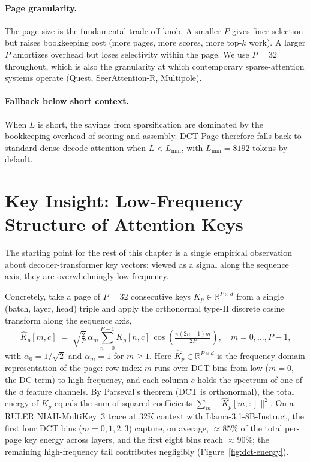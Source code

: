 \paragraph{Page granularity.}
The page size is the fundamental trade-off knob.  A smaller $P$ gives
finer selection but raises bookkeeping cost (more pages, more scores,
more top-$k$ work).  A larger $P$ amortizes overhead but loses
selectivity within the page.  We use $P{=}32$ throughout, which is
also the granularity at which contemporary sparse-attention systems
operate (Quest, SeerAttention-R, Multipole).

\paragraph{Fallback below short context.}
When $L$ is short, the savings from sparsification are dominated by
the bookkeeping overhead of scoring and assembly.  DCT-Page therefore
falls back to standard dense decode attention when
$L < L_\text{min}$, with $L_\text{min}{=}8192$ tokens by default.


\section{Key Insight: Low-Frequency Structure of Attention Keys}\label{sec:insight}

The starting point for the rest of this chapter is a single empirical
observation about decoder-transformer key vectors: viewed as a signal
along the sequence axis, they are overwhelmingly low-frequency.

Concretely, take a page of $P{=}32$ consecutive keys
$K_p \in \mathbb{R}^{P \times d}$ from a single (batch, layer, head)
triple and apply the orthonormal type-II discrete cosine transform
along the sequence axis,
\begin{equation}\label{eq:dct}
  \hat K_p[m, c] \;=\;
  \sqrt{\tfrac{2}{P}}\, \alpha_m \sum_{n=0}^{P-1}
  K_p[n, c]\,
  \cos\!\left(\tfrac{\pi (2n{+}1) m}{2P}\right),
  \quad m = 0,\dots,P{-}1,
\end{equation}
with $\alpha_0 = 1/\sqrt{2}$ and $\alpha_m = 1$ for $m \ge 1$.
Here $\hat K_p \in \mathbb{R}^{P \times d}$ is the frequency-domain
representation of the page: row index $m$ runs over DCT bins from low
($m{=}0$, the DC term) to high frequency, and each column $c$ holds
the spectrum of one of the $d$ feature channels.
By Parseval's theorem (DCT is orthonormal), the total energy of $K_p$
equals the sum of squared coefficients $\sum_m \|\hat K_p[m, :]\|^2$.
On a RULER NIAH-MultiKey~3 trace at 32K context with
Llama-3.1-8B-Instruct, the first four DCT bins ($m = 0, 1, 2, 3$)
capture, on average, $\approx 85\%$ of the total per-page key energy
across layers, and the first eight bins reach $\approx 90\%$; the
remaining high-frequency tail contributes negligibly
(Figure~\ref{fig:dct-energy}).

